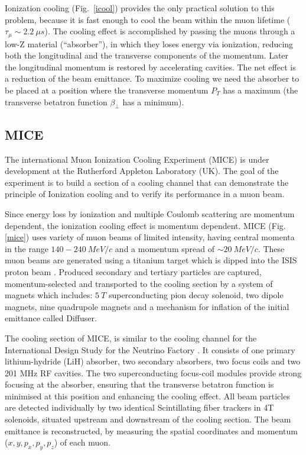 \documentclass[a4paper,11pt]{article}
\begin{document}
Ionization cooling \cite{icool1} (Fig.\ \ref{icool}) provides the only practical solution to this problem,
because it is fast enough to cool the beam within the muon lifetime ($\tau_\mu \sim 2.2 \ \mu s$). The cooling effect is
accomplished by passing the muons through a low-Z material (\textquotedblleft absorber\textquotedblright), in which they
loses energy via ionization, reducing both the longitudinal and the transverse components of the momentum. Later the
longitudinal momentum is restored by accelerating cavities. The net effect is a reduction of the beam emittance. To
maximize cooling we need the absorber to be placed at a position where the transverse momentum $P_T$ has a maximum
(the transverse betatron function $\beta_{\perp}$ has a minimum).

\subsection{MICE}
The international Muon Ionization Cooling Experiment (MICE) \cite{MICEweb} is under development at the Rutherford Appleton
Laboratory (UK). The goal of the experiment is to build a section of a cooling channel that can demonstrate the principle
of Ionization cooling and to verify its performance in a muon beam. 

Since energy loss by ionization and multiple Coulomb scattering are momentum dependent, the ionization cooling effect is
momentum dependent. MICE (Fig. \ref{mice}) uses variety of muon beams of limited intensity, having central momenta in the
range $140 - 240 \ MeV/c$ and a momentum spread of $\sim 20 \ MeV/c$. These muon beams are generated using a titanium target
\cite{target} which is dipped into the ISIS proton beam \cite{isis}. Produced secondary and tertiary particles are captured,
momentum-selected and transported to the cooling section by a system of magnets which includes: $5\ T$ superconducting pion
decay solenoid, two dipole magnets, nine quadrupole magnets and a mechanism for inflation of the initial emittance called Diffuser.

The cooling section of MICE, is similar to the cooling channel for the International Design Study
for the Neutrino Factory \cite{ids-nf}. It consists of one primary lithium-hydride (LiH) absorber, two secondary absorbers,
two focus coils and two 201 MHz RF cavities. The two superconducting focus-coil modules provide strong focusing at the
absorber, ensuring that the transverse betatron function is minimised at this position and enhancing the cooling effect. 
All beam particles are detected individually by two identical Scintillating fiber trackers in 4T
solenoids, situated upstream and downstream of the cooling section. The beam emittance is reconstructed, by measuring the
spatial coordinates and momentum ($x,y,p_x,p_y,p_z$) of each muon.
\end{document}
